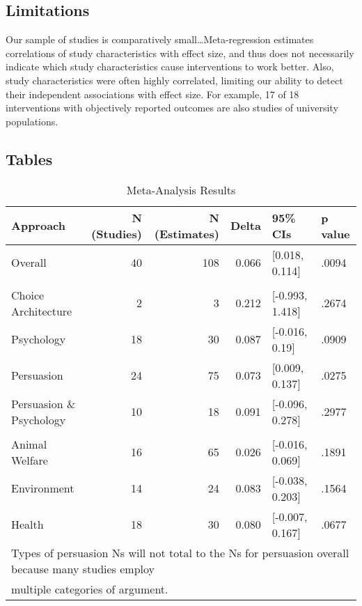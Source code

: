 \documentclass[sn-nature,referee,pdflatex]{sn-jnl}
\begin{document}
\subsection{Limitations}\label{limitations}

Our sample of studies is comparatively small\ldots Meta-regression
estimates correlations of study characteristics with effect size, and
thus does not necessarily indicate which study characteristics cause
interventions to work better. Also, study characteristics were often
highly correlated, limiting our ability to detect their independent
associations with effect size. For example, 17 of 18 interventions with
objectively reported outcomes are also studies of university
populations.

\subsection{Tables}\label{tables}

\begin{table}

\caption{\label{tab:table_one}Meta-Analysis Results}
\centering
\begin{tabular}[t]{lrrrll}
\toprule
Approach & N (Studies) & N (Estimates) & Delta & 95\% CIs & p value\\
\midrule
Overall & 40 & 108 & 0.066 & {}[0.018, 0.114] & .0094\\
\addlinespace[0.5em]
\multicolumn{6}{l}{\textbf{Theory}}\\
\hspace{1em}Choice Architecture & 2 & 3 & 0.212 & {}[-0.993, 1.418] & .2674\\
\hspace{1em}Psychology & 18 & 30 & 0.087 & {}[-0.016, 0.19] & .0909\\
\hspace{1em}Persuasion & 24 & 75 & 0.073 & {}[0.009, 0.137] & .0275\\
\hspace{1em}Persuasion \& Psychology & 10 & 18 & 0.091 & {}[-0.096, 0.278] & .2977\\
\addlinespace[0.5em]
\multicolumn{6}{l}{\textbf{Type of Persuasion}}\\
\hspace{1em}Animal Welfare & 16 & 65 & 0.026 & {}[-0.016, 0.069] & .1891\\
\hspace{1em}Environment & 14 & 24 & 0.083 & {}[-0.038, 0.203] & .1564\\
\hspace{1em}Health & 18 & 30 & 0.080 & {}[-0.007, 0.167] & .0677\\
\bottomrule
\multicolumn{6}{l}{\textsuperscript{} Types of persuasion Ns will not total to the Ns for persuasion overall because many studies employ}\\
\multicolumn{6}{l}{multiple categories of argument.}\\
\end{tabular}
\end{table}
\end{document}
